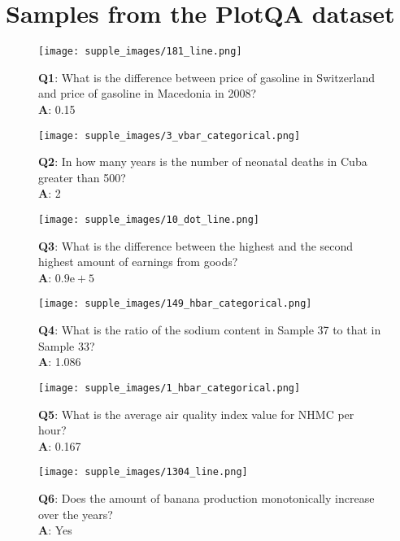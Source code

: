 \documentclass[10pt,twocolumn,letterpaper]{article}
\begin{document}
\section{Samples from the PlotQA dataset}
\label{plot_samples}
\begin{figure*}
\centering
\begin{subfigure}{.45\textwidth}
\centering
\texttt{[image: supple\_images/181\_line.png]}
\caption*{\textbf{Q1}: What is the difference between price of gasoline in Switzerland and price of gasoline in Macedonia in 2008?\\
\textbf{A}: 0.15}
\end{subfigure}
\hspace{0.2cm}
\begin{subfigure}{.45\textwidth}
\centering
\texttt{[image: supple\_images/3\_vbar\_categorical.png]}
\caption*{\textbf{Q2}: In how many years is the number of neonatal deaths in Cuba greater than 500? \\
\textbf{A}: 2
}
\end{subfigure}
\begin{subfigure}{.45\textwidth}
\centering
\texttt{[image: supple\_images/10\_dot\_line.png]}
\caption*{
\textbf{Q3}:  What is the difference between the highest and the second highest amount of earnings from goods?\\
\textbf{A}: $0.9\mathrm{e}+5$}
\end{subfigure}
\hspace{0.2cm}
\begin{subfigure}{.45\textwidth}
\centering
\texttt{[image: supple\_images/149\_hbar\_categorical.png]}
\caption*{\textbf{Q4}: What is the ratio of the sodium content in Sample 37 to that in Sample 33?\\
\textbf{A}: 1.086
}
\end{subfigure}
\begin{subfigure}{.45\textwidth}
\texttt{[image: supple\_images/1\_hbar\_categorical.png]}
\caption*{
\textbf{Q5}: What is the average air quality index value for NHMC per hour?\\
\textbf{A}: 0.167
}
\end{subfigure}
\hspace{0.2cm}
\begin{subfigure}{.45\textwidth}
\texttt{[image: supple\_images/1304\_line.png]}
\caption*{\textbf{Q6}: Does the amount of banana production monotonically increase over the years?\\
\textbf{A}: Yes
}
\end{subfigure}
\end{figure*}
\end{document}
